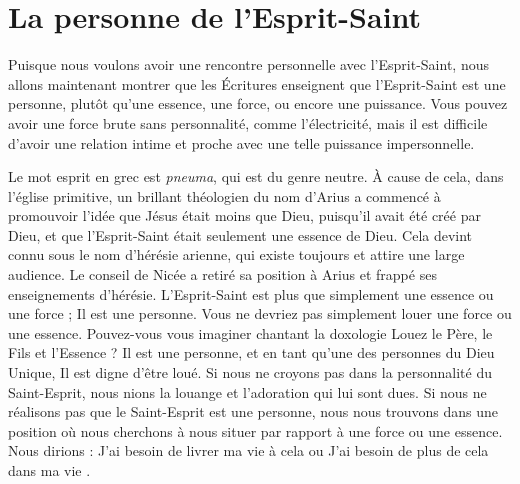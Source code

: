 \chapter{La personne de l'Esprit-Saint}

Puisque nous voulons avoir une rencontre personnelle avec l'Esprit-Saint, nous allons maintenant montrer que les Écritures enseignent que l'Esprit-Saint est une personne, plutôt qu'une essence, une force, ou encore une puissance. Vous pouvez avoir une force brute sans personnalité, comme l'électricité, mais il est difficile d'avoir une relation intime et proche avec une telle puissance impersonnelle.

Le mot \og esprit \fg{} en grec est \emph{pneuma}, qui est du genre neutre. À cause de cela, dans l'église primitive, un brillant théologien du nom d'Arius a commencé à promouvoir l'idée que Jésus était moins que Dieu, puisqu'il avait été créé par Dieu, et que l'Esprit-Saint était seulement une \og essence \fg{} de Dieu. Cela devint connu sous le nom d'hérésie arienne, qui existe toujours et attire une large audience. Le conseil de Nicée a retiré sa position à Arius et frappé ses enseignements d'hérésie. L'Esprit-Saint est plus que simplement une essence ou une force ; Il est une personne. Vous ne devriez pas simplement louer une force ou une essence. Pouvez-vous vous imaginer chantant la doxologie \og Louez le Père, le Fils et l'Essence \fg{} ? Il est une personne, et en tant qu'une des personnes du Dieu Unique, Il est digne d'être loué. Si nous ne croyons pas dans la personnalité du Saint-Esprit, nous nions la louange et l'adoration qui lui sont dues. Si nous ne réalisons pas que le Saint-Esprit est une personne, nous nous trouvons dans une position où nous cherchons à nous situer par rapport à une force ou une essence. Nous dirions : \og J'ai besoin de livrer ma vie à cela \fg{} ou \og J'ai besoin de plus de cela dans ma vie .\fg



